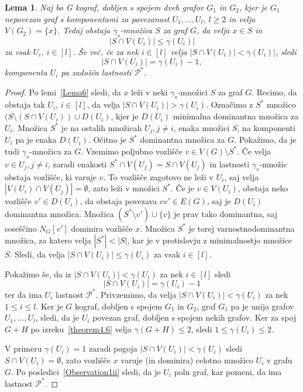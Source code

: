 \documentclass[12pt,a4paper,twoside]{article}
\theoremstyle{definition} %
\theoremstyle{plain} %
\newtheorem{lema}[definicija]{Lema}
\numberwithin{equation}{section}  %
\begin{document}
\begin{lema}\label{Lema7}Naj bo G kograf, dobljen s spojem dveh grafov $G_1$ in $G_2$, kjer je $G_1$ nepovezan graf s komponentami za povezanost $U_1, \dots, U_l$, $l \geq 2$ in velja $V(G_2)=\{x\}$.  Tedaj obstaja $\gamma_s$-množica $S$ za graf $G$, da velja $x \in S$ in $$|S \cap V(U_i)| \leq \gamma(U_i)|$$ za vsak $U_i$, $i \in [l]$. Še več, če za nek  $i \in [l]$ velja $|S \cap V(U_i)| < \gamma(U_i)|$, sledi $$|S \cap V(U_i)| = \gamma(U_i) - 1,$$ komponenta $U_i$ pa zadošča lastnosti $\mathcal{P^*}$. 
\end{lema}

\begin{proof}
Po lemi~\ref{Lema6} sledi, da $x$ leži v neki $\gamma_s$-množici $S$ za graf $G$. Recimo, da obstaja tak $U_i$, $i \in [l]$, da velja $|S \cap V(U_i)| > \gamma(U_i)$. Označimo z $S^*$ množico $(S \setminus (S \cap V(U_i)) \cup D(U_i)$, kjer je $D(U_i)$ minimalna dominantna množica za $U_i$. Množica $S^*$ je na ostalih množicah $U_j, j\neq i$, enaka množici $S$, na komponenti $U_i$ pa je enaka $D(U_i)$. Očitno je  $S^*$ dominantna množica za $G$. Pokažimo, da je tudi $\gamma_s$-množica za $G$.
Vzemimo poljubno vozlišče $v \in V(G) \setminus  S^*$. Če velja $v \in U_j, j\neq i$, zaradi enakosti $S^* \cap V(U_j) = S \cap V(U_j)$  in lastnosti $\gamma_s$-množic obstaja vozlišče, ki varuje $v$. To vozlišče zagotovo ne leži v $U_i$, saj velja $|V(U_i) \cap V(U_j)| = \emptyset$, zato leži v množici $S^*$. Če je $v \in V(U_i)$, obstaja neko vozlišče $v' \in D(U_i)$, da obstaja povezava $vv' \in E(G)$, saj je $D(U_i)$ dominantna množica. Množica $(S^* \setminus v') \cup \{v\}$ je prav tako dominantna, saj soseščino $N_G[v']$ dominira vozlišče $x$. Množica $S^*$ je torej varnostnodominantna množica, za katero velja $|S^*| < |S|$, kar je v protislovju z minimalnostjo množice $S$. Sledi, da velja $|S \cap V(U_i)| \leq \gamma(U_i)$ za vsak $i \in [l]$.

\medskip
Pokažimo še, da iz $|S \cap V(U_i)| < \gamma(U_i)$ za nek $i \in [l]$ sledi $$|S \cap V(U_i)| = \gamma(U_i) - 1$$ ter da ima $U_i$ lastnost $\mathcal{P^*}$. Privzemimo, da velja $|S \cap V(U_i)| < \gamma(U_i)$ za nek $1 \leq i \leq l$. Ker je $G$ kograf, dobljen s spojem $G_1$ in $G_2$, graf $G_1$ pa je unija grafov $U_1, \dots, U_l$, sledi, da je $U_i$ povezan graf, dobljen s spojem nekih grafov. Ker za spoj $G + H$ po izreku~\ref{theorem4.6} velja $\gamma(G+H)\leq 2$, sledi $1 \leq \gamma(U_i) \leq 2$.

V primeru $\gamma(U_i) = 1$ zaradi pogoja $|S \cap V(U_i)| < \gamma(U_i)$ sledi $S \cap V(U_i) = \emptyset$, zato vozlišče $x$ varuje (in dominira) celotno množico $U_i$ v grafu $G$. Po posledici~\ref{Observation1ii} sledi, da je $U_i$ poln graf, kar pomeni, da ima lastnost $\mathcal{P^*}$.


\end{proof}
\end{document}
